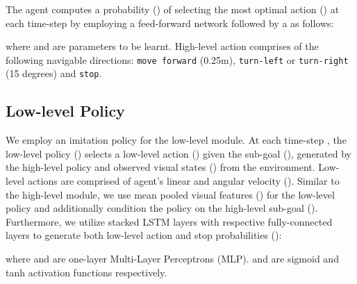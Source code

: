 \documentclass[letter, 10pt, conference]{ieeeconf}
\begin{document}
The agent computes a probability () of selecting the most optimal action () at each time-step by employing a feed-forward network followed by a  as follows:

where  and  are parameters to be learnt. High-level action  comprises of the following navigable directions: \texttt{move forward} (0.25m), \texttt{turn-left} or \texttt{turn-right} (15 degrees) and \texttt{stop}.

\subsection{Low-level Policy}
We employ an imitation policy for the low-level module. 
At each time-step , the low-level policy () selects a low-level action () given the sub-goal (), generated by the high-level policy and observed visual states () from the environment. Low-level actions are comprised of agent's linear and angular velocity (). Similar to the high-level module, we use mean pooled visual features () for the low-level policy and additionally condition the policy on the high-level sub-goal (). Furthermore, we utilize stacked LSTM layers with respective fully-connected layers to generate both low-level action and stop probabilities ():

 
where  and  are one-layer Multi-Layer Perceptrons (MLP).  and  are sigmoid and tanh activation functions respectively.
\end{document}
